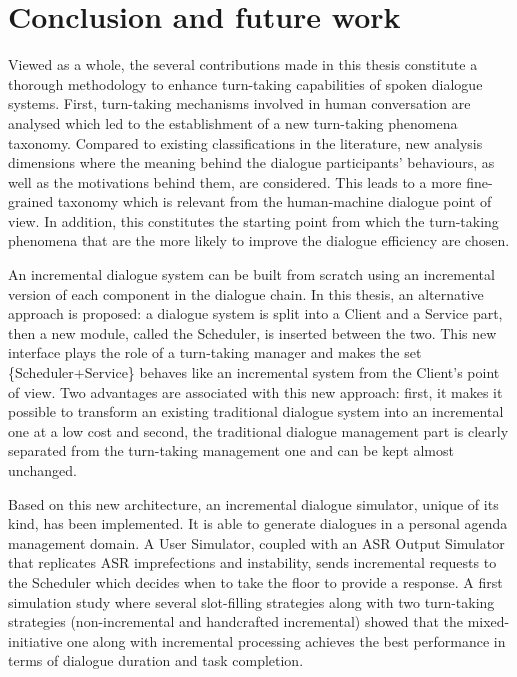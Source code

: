 \chapter*{Conclusion and future work}

	Viewed as a whole, the several contributions made in this thesis constitute a thorough methodology to enhance turn-taking capabilities of spoken dialogue systems. First, turn-taking mechanisms involved in human conversation are analysed which led to the establishment of a new turn-taking phenomena taxonomy. Compared to existing classifications in the literature, new analysis dimensions where the meaning behind the dialogue participants' behaviours, as well as the motivations behind them, are considered. This leads to a more fine-grained taxonomy which is relevant from the human-machine dialogue point of view. In addition, this constitutes the starting point from which the turn-taking phenomena that are the more likely to improve the dialogue efficiency are chosen.

        An incremental dialogue system can be built from scratch using an incremental version of each component in the dialogue chain. In this thesis, an alternative approach is proposed: a dialogue system is split into a Client and a Service part, then a new module, called the Scheduler, is inserted between the two. This new interface plays the role of a turn-taking manager and makes the set \{Scheduler+Service\} behaves like an incremental system from the Client's point of view. Two advantages are associated with this new approach: first, it makes it possible to transform an existing traditional dialogue system into an incremental one at a low cost and second, the traditional dialogue management part is clearly separated from the turn-taking management one and can be kept almost unchanged.

        Based on this new architecture, an incremental dialogue simulator, unique of its kind, has been implemented. It is able to generate dialogues in a personal agenda management domain. A User Simulator, coupled with an ASR Output Simulator that replicates ASR imprefections and instability, sends incremental requests to the Scheduler which decides when to take the floor to provide a response. A first simulation study where several slot-filling strategies along with two turn-taking strategies (non-incremental and handcrafted incremental) showed that the mixed-initiative one along with incremental processing achieves the best performance in terms of dialogue duration and task completion.

